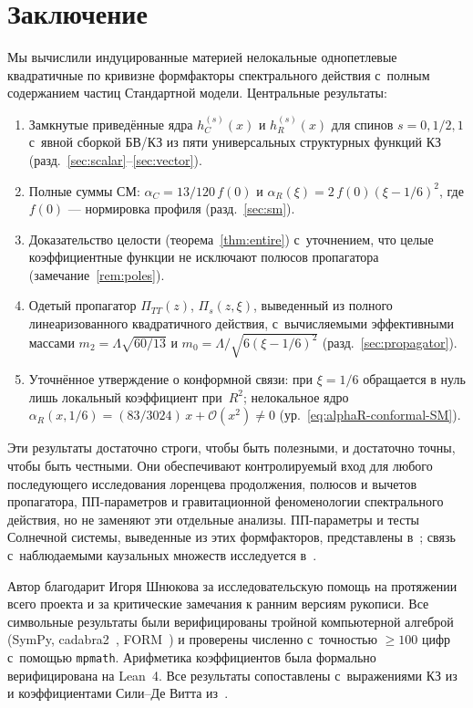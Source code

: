 \documentclass[aps,prd,twocolumn,superscriptaddress,nofootinbib,floatfix]{revtex4-2}
\theoremstyle{definition}
\theoremstyle{remark}
\begin{document}
\section{Заключение}
\label{sec:conclusions}

Мы вычислили индуцированные материей нелокальные однопетлевые квадратичные
по кривизне формфакторы спектрального действия с~полным содержанием частиц
Стандартной модели. Центральные результаты:

\begin{enumerate}
\item Замкнутые приведённые ядра $h_C^{(s)}(x)$ и $h_R^{(s)}(x)$ для
  спинов $s = 0, 1/2, 1$ с~явной сборкой БВ/КЗ из пяти универсальных
  структурных функций КЗ
  (разд.~\ref{sec:scalar}--\ref{sec:vector}).
\item Полные суммы СМ: $\alpha_C = 13/120\,f(0)$ и
  $\alpha_R(\xi) = 2\,f(0)(\xi - 1/6)^2$, где $f(0)$ --- нормировка
  профиля (разд.~\ref{sec:sm}).
\item Доказательство целости (теорема~\ref{thm:entire}) с~уточнением,
  что целые коэффициентные функции не исключают полюсов пропагатора
  (замечание~\ref{rem:poles}).
\item Одетый пропагатор $\Pi_{TT}(z)$, $\Pi_s(z,\xi)$, выведенный из
  полного линеаризованного квадратичного действия, с~вычисляемыми
  эффективными массами $m_2 = \Lambda\sqrt{60/13}$ и
  $m_0 = \Lambda/\sqrt{6(\xi - 1/6)^2}$ (разд.~\ref{sec:propagator}).
\item Уточнённое утверждение о конформной связи: при $\xi = 1/6$
  обращается в нуль лишь локальный коэффициент при~$R^2$; нелокальное ядро
  $\alpha_R(x, 1/6) = (83/3024)\,x + \mathcal{O}(x^2) \neq 0$
  (ур.~\eqref{eq:alphaR-conformal-SM}).
\end{enumerate}

Эти результаты достаточно строги, чтобы быть полезными, и достаточно
точны, чтобы быть честными. Они обеспечивают контролируемый вход для любого
последующего исследования лоренцева продолжения, полюсов и вычетов
пропагатора, ПП-параметров и гравитационной феноменологии спектрального
действия, но не заменяют эти отдельные анализы. ПП-параметры и тесты
Солнечной системы, выведенные из этих формфакторов, представлены
в~\cite{Alfyorov:2026sct2}; связь с~наблюдаемыми каузальных множеств
исследуется в~\cite{Alfyorov:2026sct7}.


\begin{acknowledgments}
Автор благодарит Игоря Шнюкова за исследовательскую помощь на протяжении
всего проекта и за критические замечания к ранним версиям рукописи.
Все символьные результаты были верифицированы тройной компьютерной алгеброй
(SymPy, cadabra2~\cite{Peeters:2007wn}, FORM~\cite{Vermaseren:2000nd})
и проверены численно с~точностью $\geq 100$ цифр с~помощью
\texttt{mpmath}. Арифметика коэффициентов была формально верифицирована
на Lean~4. Все результаты сопоставлены с~выражениями КЗ
из~\cite{Codello:2012kq} и коэффициентами Сили--Де Витта
из~\cite{Vassilevich:2003xt,Avramidi:2000bm}.
\end{acknowledgments}
\end{document}

